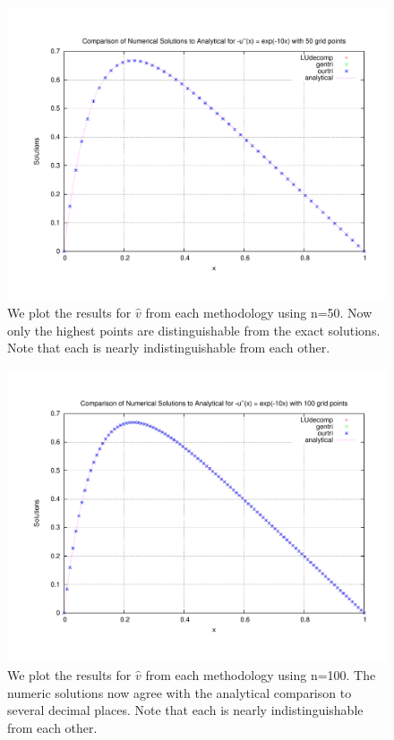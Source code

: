 \documentclass[11pt,a4paper]{article}
\begin{document}
\begin{figure}
\centering
\includegraphics[width=1.0\textwidth]{comparisonplot_50.pdf}
\caption{We plot the results for $\hat{v}$ from each methodology using n=50. Now only the highest points are distinguishable from the exact solutions. Note that each is nearly indistinguishable from each other.}
\end{figure}
\begin{figure}
\centering
\includegraphics[width=1.0\textwidth]{comparisonplot_100.pdf}
\caption{We plot the results for $\hat{v}$ from each methodology using n=100. The numeric solutions now agree with the analytical comparison to several decimal places. Note that each is nearly indistinguishable from each other.}
\end{figure}
\end{document}
